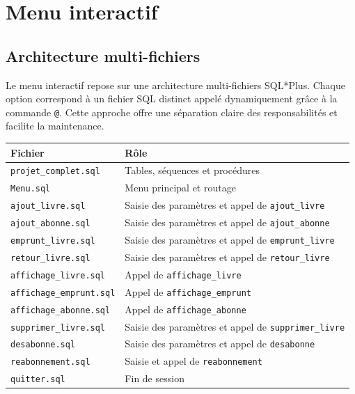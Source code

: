 \documentclass[12pt, a4paper]{report}
\begin{document}
\chapter{Menu interactif}

\section{Architecture multi-fichiers}
Le menu interactif repose sur une architecture multi-fichiers SQL*Plus.
Chaque option correspond à un fichier SQL distinct appelé dynamiquement
grâce à la commande \texttt{@}. Cette approche offre une séparation claire
des responsabilités et facilite la maintenance.

\begin{center}
	\begin{tabular}{|l|l|}
		\hline
		\textbf{Fichier} & \textbf{Rôle} \\
		\hline
		\texttt{projet\_complet.sql} & Tables, séquences et procédures \\
		\texttt{Menu.sql} & Menu principal et routage \\
		\texttt{ajout\_livre.sql} & Saisie des paramètres et appel de \texttt{ajout\_livre} \\
		\texttt{ajout\_abonne.sql} & Saisie des paramètres  et appel de \texttt{ajout\_abonne} \\
		\texttt{emprunt\_livre.sql} & Saisie des paramètres  et appel de \texttt{emprunt\_livre} \\
		\texttt{retour\_livre.sql} & Saisie des paramètres  et appel de \texttt{retour\_livre} \\
		\texttt{affichage\_livre.sql} & Appel de \texttt{affichage\_livre} \\
		\texttt{affichage\_emprunt.sql} & Appel de \texttt{affichage\_emprunt} \\
		\texttt{affichage\_abonne.sql} & Appel de \texttt{affichage\_abonne} \\
		\texttt{supprimer\_livre.sql} & Saisie des paramètres  et appel de \texttt{supprimer\_livre} \\
		\texttt{desabonne.sql} & Saisie des paramètres  et appel de \texttt{desabonne} \\
		\texttt{reabonnement.sql} & Saisie et appel de \texttt{reabonnement} \\
		\texttt{quitter.sql} & Fin de session \\
		\hline
	\end{tabular}
\end{center}
\end{document}
